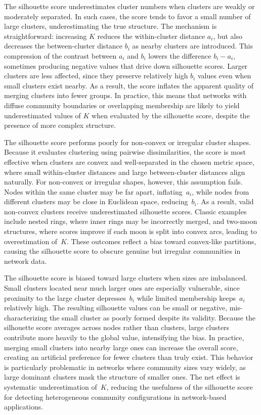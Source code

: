\documentclass[12pt, titlepage, reqno]{article}
\begin{document}
The silhouette score underestimates cluster numbers when clusters are
weakly or moderately separated. In such cases, the score tends to
favor a small number of large clusters, underestimating the true
structure. The mechanism is straightforward: increasing $K$ reduces
the within-cluster distance $a_i$, but also decreases the
between-cluster distance $b_i$ as nearby clusters are introduced.
This compression of the contrast between $a_i$ and $b_i$ lowers the
difference $b_i - a_i$, sometimes producing negative values that
drive down silhouette scores. Larger clusters are less affected,
since they preserve relatively high $b_i$ values even when small
clusters exist nearby. As a result, the score inflates the apparent
quality of merging clusters into fewer groups. In practice, this
means that networks with diffuse community boundaries or overlapping
membership are likely to yield underestimated values of $K$ when
evaluated by the silhouette score, despite the presence of more
complex structure.


The silhouette score performs poorly for non-convex or irregular
cluster shapes. Because it evaluates clustering using pairwise
dissimilarities, the score is most effective when clusters are
convex and well-separated in the chosen metric space,
where small within-cluster distances and large
between-cluster distances align naturally. For non-convex or
irregular shapes, however, this assumption fails. Nodes within the
same cluster may be far apart, inflating~$a_i$, while nodes from
different clusters may be close in Euclidean space, reducing~$b_i$.
As a result, valid non-convex clusters receive underestimated
silhouette scores. Classic examples include nested rings, where inner
rings may be incorrectly merged, and two-moon structures, where
scores improve if each moon is split into convex arcs, leading to
overestimation of~$K$. These outcomes reflect a bias toward
convex-like partitions, causing the silhouette score to obscure
genuine but irregular communities in network data.


The silhouette score is biased toward large clusters when sizes are
imbalanced. Small clusters located near much larger ones are
especially vulnerable, since proximity to the large cluster
depresses~$b_i$ while limited membership keeps~$a_i$ relatively
high. The resulting silhouette values can be small or negative,
mis-characterizing the small cluster as poorly formed despite its
validity. Because the silhouette score averages across nodes rather
than clusters, large clusters contribute more heavily to the global
value, intensifying the bias.
In practice, merging small clusters into nearby large ones
can increase the overall score, creating an artificial preference for
fewer clusters than truly exist. This behavior is particularly
problematic in networks where community sizes vary widely, as large
dominant clusters mask the structure of smaller ones. The net effect
is systematic underestimation of~$K$, reducing the usefulness of the
silhouette score for detecting heterogeneous community configurations
in network-based applications.
\end{document}
